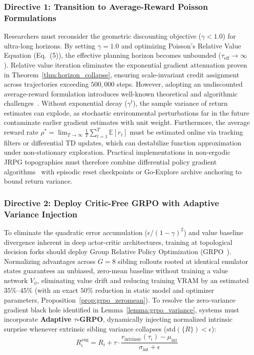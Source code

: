 \documentclass[journal,10pt,twocolumn]{IEEEtran}
\begin{document}
\subsubsection{Directive 1: Transition to Average-Reward Poisson Formulations}
Researchers must reconsider the geometric discounting objective ($\gamma < 1.0$) for ultra-long horizons. By setting $\gamma = 1.0$ and optimizing Poisson's Relative Value Equation (Eq.~(5)), the effective planning horizon becomes unbounded ($\tau_{\text{eff}} \to \infty$). Relative value iteration eliminates the exponential gradient attenuation proven in Theorem~\ref{thm:horizon_collapse}, ensuring scale-invariant credit assignment across trajectories exceeding $500{,}000$ steps. However, adopting an undiscounted average-reward formulation introduces well-known theoretical and algorithmic challenges~\cite{mahadevan1996average,wan2021averagereward}. Without exponential decay ($\gamma^t$), the sample variance of return estimates can explode, as stochastic environmental perturbations far in the future contaminate earlier gradient estimates with unit weight. Furthermore, the average reward rate $\rho^* = \lim_{T\to\infty} \frac{1}{T}\sum_{t=1}^T \mathbb{E}[r_t]$ must be estimated online via tracking filters or differential TD updates, which can destabilize function approximation under non-stationary exploration. Practical implementations in non-ergodic JRPG topographies must therefore combine differential policy gradient algorithms~\cite{wan2021averagereward} with episodic reset checkpoints or Go-Explore archive anchoring to bound return variance.

\subsubsection{Directive 2: Deploy Critic-Free GRPO with Adaptive Variance Injection}
To eliminate the quadratic error accumulation ($\epsilon/(1-\gamma)^2$) and value baseline divergence inherent in deep actor-critic architectures, training at topological decision forks should deploy Group Relative Policy Optimization (GRPO~\cite{shao2024deepseekmath}). Normalizing advantages across $G=8$ sibling rollouts rooted at identical emulator states guarantees an unbiased, zero-mean baseline without training a value network $V_\phi$, eliminating value drift and reducing training VRAM by an estimated $35\%$--$45\%$ (with an exact $50\%$ reduction in static model and optimizer parameters, Proposition~\ref{prop:grpo_zeromean}). To resolve the zero-variance gradient black hole identified in Lemma~\ref{lemma:grpo_variance}, systems must incorporate \textbf{Adaptive $\tau$-GRPO}, dynamically injecting normalized intrinsic surprise whenever extrinsic sibling variance collapses ($\text{std}(\{R\}) < \epsilon$):
\begin{equation}
R_i^{\text{aug}} = R_i + \tau \cdot \frac{r_{\text{intrinsic}}(\tau_i) - \mu_{\text{int}}}{\sigma_{\text{int}} + \epsilon}
\end{equation}
\end{document}
